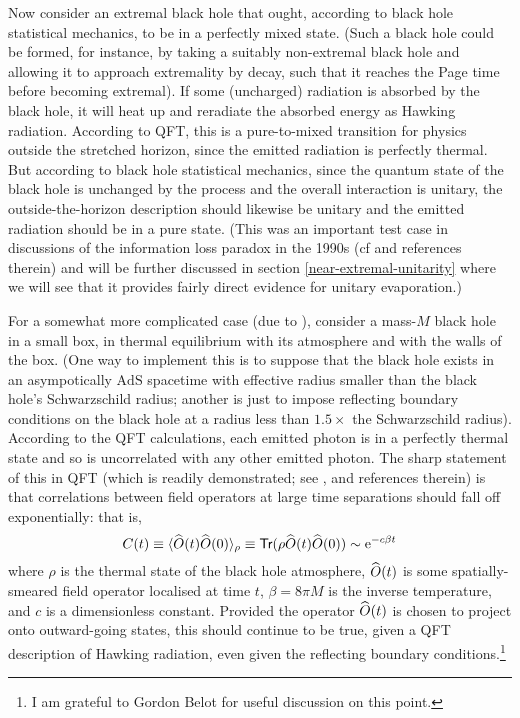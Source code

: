 \documentclass[12pt]{article}
\newcommand{\AdS}{\mbox{AdS}}
\newcommand{\op}[1]{\ensuremath{\widehat{\textsf{\ensuremath{#1}}}}}
\newcommand{\tr}{\textsf{Tr}}
\newcommand{\be}{\begin{equation}}
\newcommand{\ee}{\end{equation}}
\newcommand{\e}[1]{\mathrm{e}^{#1}}
\begin{document}
Now consider an extremal black hole that ought, according to black hole statistical mechanics, to be in a perfectly mixed state. (Such a black hole could be formed, for instance, by taking a suitably non-extremal black hole and allowing it to approach extremality by decay, such that it reaches the Page time before becoming extremal).  If some (uncharged) radiation is absorbed by the black hole, it will heat up and reradiate the absorbed energy as Hawking radiation. According to QFT, this is a pure-to-mixed transition for physics outside the stretched horizon, since the emitted radiation is perfectly thermal. But according to black hole statistical mechanics, since the quantum state of the black hole is unchanged by the process and the overall interaction is unitary, the outside-the-horizon description should likewise be unitary and the emitted radiation should be in a pure state. (This was an important test case in discussions of the information loss paradox in the 1990s (cf  and references therein) and will be further discussed in section \ref{near-extremal-unitarity} where we will see that it provides fairly direct evidence for unitary evaporation.)

For a somewhat more complicated case (due to ), consider a mass-$M$ black hole in a small box, in thermal equilibrium with its atmosphere and with the walls of the box. (One way to implement this is to suppose that the black hole exists in an asympotically $\AdS$ spacetime with effective radius smaller than the black hole's Schwarzschild radius; another \cite{yorkcanonical} is just to impose reflecting boundary conditions on the black hole at a radius less than $1.5 \times$ the Schwarzschild radius). According to the QFT calculations, each emitted photon is in a perfectly thermal state and so is uncorrelated with any other emitted photon. The sharp statement of this in QFT (which is readily demonstrated; see ,  and references therein) is that correlations between field operators at large time separations should fall off exponentially: that is,
\be
C(t)\equiv \langle \op{O}(t)\op{O}(0)\rangle_\rho \equiv \tr (\rho \op{O}(t)\op{O}(0)) \sim \e{-c \beta t}
\ee
where $\rho$ is the thermal state of the black hole atmosphere, $\op{O}(t)$ is some spatially-smeared field operator localised at time $t$, $\beta=8\pi M$ is the inverse temperature, and $c$ is a dimensionless constant. Provided the operator $\op{O}(t)$ is chosen to project onto outward-going states, this should continue to be true, given a QFT description of Hawking radiation, even given the reflecting boundary conditions.\footnote{I am grateful to Gordon Belot for useful discussion on this point.}
\end{document}
